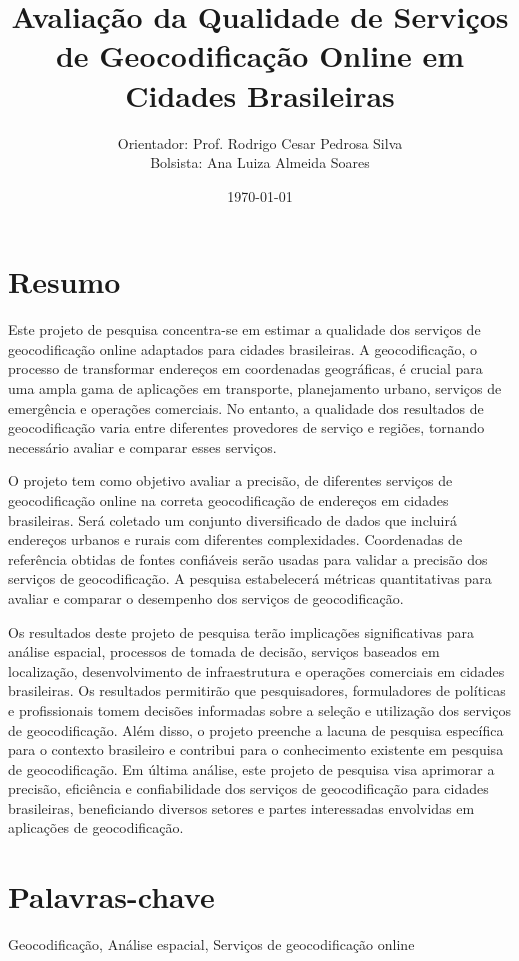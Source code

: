 \documentclass{article}
\title{Avaliação da Qualidade de Serviços de Geocodificação Online em Cidades Brasileiras}
\author{Orientador: Prof. Rodrigo Cesar Pedrosa Silva \\
Bolsista: Ana Luiza Almeida Soares}
\date{\today}
\begin{document}
\maketitle

\section*{Resumo}
Este projeto de pesquisa concentra-se em estimar a qualidade dos serviços de geocodificação online adaptados para cidades brasileiras. A geocodificação, o processo de transformar endereços em coordenadas geográficas, é crucial para uma ampla gama de aplicações em transporte, planejamento urbano, serviços de emergência e operações comerciais. No entanto, a qualidade dos resultados de geocodificação varia entre diferentes provedores de serviço e regiões, tornando necessário avaliar e comparar esses serviços.

O projeto tem como objetivo avaliar a precisão, de diferentes serviços de geocodificação online na correta geocodificação de endereços em cidades brasileiras. Será coletado um conjunto diversificado de dados que incluirá endereços urbanos e rurais com diferentes complexidades. Coordenadas de referência obtidas de fontes confiáveis serão usadas para validar a precisão dos serviços de geocodificação. A pesquisa estabelecerá métricas quantitativas para avaliar e comparar o desempenho dos serviços de geocodificação.

Os resultados deste projeto de pesquisa terão implicações significativas para análise espacial, processos de tomada de decisão, serviços baseados em localização, desenvolvimento de infraestrutura e operações comerciais em cidades brasileiras. Os resultados permitirão que pesquisadores, formuladores de políticas e profissionais tomem decisões informadas sobre a seleção e utilização dos serviços de geocodificação. Além disso, o projeto preenche a lacuna de pesquisa específica para o contexto brasileiro e contribui para o conhecimento existente em pesquisa de geocodificação. Em última análise, este projeto de pesquisa visa aprimorar a precisão, eficiência e confiabilidade dos serviços de geocodificação para cidades brasileiras, beneficiando diversos setores e partes interessadas envolvidas em aplicações de geocodificação.
   
\section*{Palavras-chave}
Geocodificação, Análise espacial, Serviços de geocodificação online
   
\end{document}
